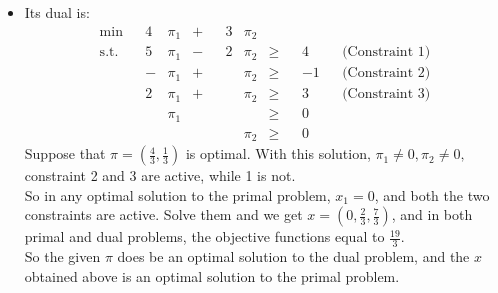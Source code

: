 \documentclass{article}
\begin{document}
	\begin{itemize}
		\item [3.]
		Its dual is:
		\begin{equation*}
			\begin{aligned}
				\text{min}&&4&\pi_1&+&&3&\pi_2&&&&\\
				\text{s.t.}&&5&\pi_1&-&&2&\pi_2&\geq&&4&&\text{(Constraint 1)}\\
				&&-&\pi_1&+&&&\pi_2&\geq&&-1&&\text{(Constraint 2)}\\
				&&2&\pi_1&+&&&\pi_2&\geq&&3&&\text{(Constraint 3)}\\
				&&&\pi_1&&&&&\geq&&0&\\
				&&&&&&&\pi_2&\geq&&0&
			\end{aligned}
		\end{equation*}
		Suppose that $\pi=(\frac{4}{3},\frac{1}{3})$ is optimal. With this solution, $\pi_1\neq 0, \pi_2\neq 0,$ constraint 2 and 3 are active, while 1 is not.\\
		So in any optimal solution to the primal problem, $x_1=0$, and both the two constraints are active. Solve them and we get $x=(0,\frac{2}{3},\frac{7}{3})$, and in both primal and dual problems, the objective functions equal to $\frac{19}{3}$.\\
		So the given $\pi$ does be an optimal solution to the dual problem, and the $x$ obtained above is an optimal solution to the primal problem.
	\end{itemize}
\end{document}
